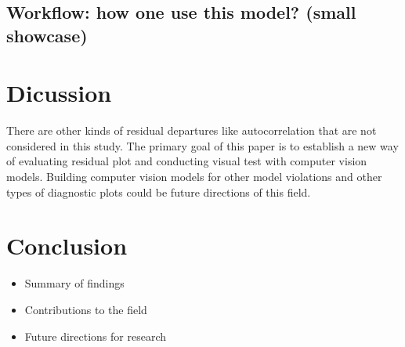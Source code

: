 \documentclass[]{interact}
\theoremstyle{plain}%
\theoremstyle{definition}
\theoremstyle{remark}
\providecommand{\tightlist}{%
  \setlength{\itemsep}{0pt}\setlength{\parskip}{0pt}}
\def\tightlist{}
\begin{document}
\hypertarget{workflow-how-one-use-this-model-small-showcase}{%
\subsection{Workflow: how one use this model? (small
showcase)}\label{workflow-how-one-use-this-model-small-showcase}}

\hypertarget{dicussion}{%
\section{Dicussion}\label{dicussion}}

There are other kinds of residual departures like autocorrelation that
are not considered in this study. The primary goal of this paper is to
establish a new way of evaluating residual plot and conducting visual
test with computer vision models. Building computer vision models for
other model violations and other types of diagnostic plots could be
future directions of this field.

\hypertarget{conclusion}{%
\section{Conclusion}\label{conclusion}}

\begin{itemize}
\tightlist
\item
  Summary of findings
\item
  Contributions to the field
\item
  Future directions for research
\end{itemize}



\end{document}
